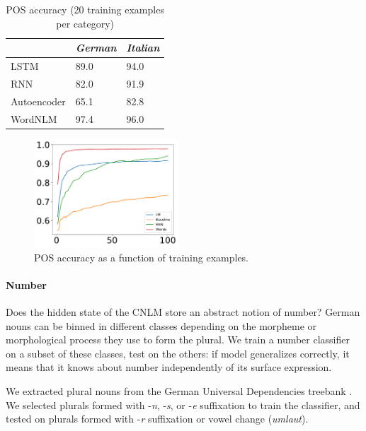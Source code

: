 \begin{table}[t]
  \begin{center}
    \begin{tabular}{l|l|l}
   &\emph{German}&\emph{Italian}\\
      \hline
      LSTM & 89.0 & 94.0 \\
      RNN & 82.0 & 91.9 \\
      Autoencoder & 65.1 & 82.8 \\
      WordNLM & 97.4 & 96.0 \\
    \end{tabular}
  \end{center}
  \caption{\label{tab:pos-results} POS accuracy (20 training examples per category)}
\end{table}


\begin{figure}
\includegraphics[width=0.48\textwidth]{figures/german_pos_nouns_verbs.pdf}
	\caption{POS accuracy as a function of training examples.}\label{fig:pos-induction}
\end{figure}





\paragraph{Number}
Does the hidden state of the CNLM store an abstract notion of
number?
German nouns can be binned in different classes depending on
the morpheme or morphological process they use to form the plural. We
train a number classifier on a subset of these classes, test on the
others: if model generalizes correctly, it means that it knows about
number independently of its surface expression.

We extracted plural nouns from the German Universal Dependencies treebank \cite{de2006generating,mcdonald2013universal}.
We selected plurals formed with -\emph{n}, -\emph{s}, or -\emph{e} suffixation to train the classifier, and tested on plurals formed with -\emph{r} suffixation or vowel change (\emph{umlaut}).

